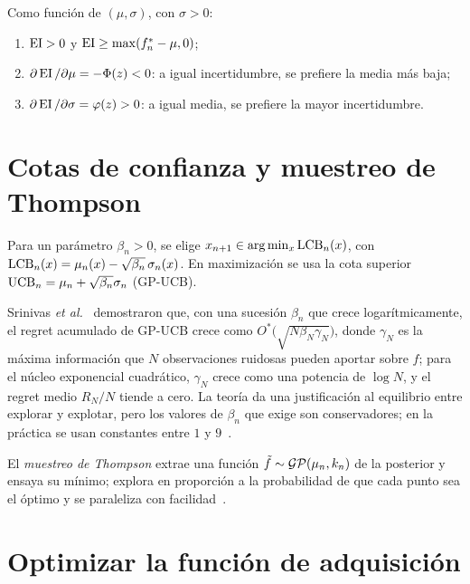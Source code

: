 \begin{proposicion}\label{prop:ei}
Como función de $(\mu,\sigma)$, con $\sigma>0$:
\begin{enumerate}
  \item $\operatorname{EI}>0$ y $\operatorname{EI}\ge\max(f^{*}_{n}-\mu,0)$;
  \item $\partial\operatorname{EI}/\partial\mu=-\Phi(z)<0$: a igual incertidumbre, se prefiere la media más baja;
  \item $\partial\operatorname{EI}/\partial\sigma=\varphi(z)>0$: a igual media, se prefiere la mayor incertidumbre.
\end{enumerate}
\end{proposicion}

\addtocounter{definicion}{1}%

\addtocounter{figure}{1}%

\section{Cotas de confianza y muestreo de Thompson}

\begin{definicion}\label{def:lcb}
Para un parámetro $\beta_n>0$, se elige $x_{n+1}\in\arg\min_x\operatorname{LCB}_n(x)$, con $\operatorname{LCB}_n(x)=\mu_n(x)-\sqrt{\beta_n}\,\sigma_n(x)$. En maximización se usa la cota superior $\operatorname{UCB}_n=\mu_n+\sqrt{\beta_n}\sigma_n$ (GP-UCB).
\end{definicion}

Srinivas \emph{et al.}~\cite{srinivas} demostraron que, con una sucesión $\beta_n$ que crece logarítmicamente, el regret acumulado de GP-UCB crece como $O^*\bigl(\sqrt{N\beta_N\gamma_N}\bigr)$, donde $\gamma_N$ es la máxima información que $N$ observaciones ruidosas pueden aportar sobre $f$; para el núcleo exponencial cuadrático, $\gamma_N$ crece como una potencia de $\log N$, y el regret medio $R_N/N$ tiende a cero. La teoría da una justificación al equilibrio entre explorar y explotar, pero los valores de $\beta_n$ que exige son conservadores; en la práctica se usan constantes entre $1$ y $9$~\cite[§8.4 y cap.~10]{garnett}.

El \emph{muestreo de Thompson} extrae una función $\tilde f\sim\mathcal{GP}(\mu_n,k_n)$ de la posterior y ensaya su mínimo; explora en proporción a la probabilidad de que cada punto sea el óptimo y se paraleliza con facilidad~\cite[§7.9]{garnett}.

\section{Optimizar la función de adquisición}

